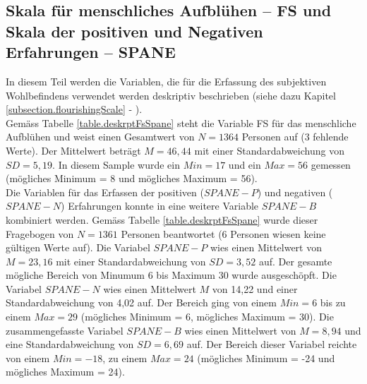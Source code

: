\subsection{Skala für menschliches Aufblühen -- FS und Skala der positiven und Negativen Erfahrungen -- SPANE}
In diesem Teil werden die Variablen, die für die Erfassung des subjektiven Wohlbefindens verwendet werden deskriptiv beschrieben (siehe dazu Kapitel \ref{subsection.flourishingScale} - ).\\
Gemäss Tabelle \ref{table.deskrptFsSpane} steht die Variable FS für das menschliche Aufblühen und weist einen Gesamtwert von $N = 1364$ Personen auf (3 fehlende Werte). Der Mittelwert beträgt $M = 46,44$ mit einer Standardabweichung von $SD = 5,19$. In diesem Sample wurde ein $Min = 17$ und ein $Max = 56$ gemessen (mögliches Minimum = 8 und mögliches Maximum = 56).\\
Die Variablen für das Erfassen der positiven ($SPANE-P$) und negativen ($SPANE-N$) Erfahrungen konnte in eine weitere Variable $SPANE-B$ kombiniert werden. Gemäss Tabelle \ref{table.deskrptFsSpane} wurde dieser Fragebogen von $N = 1361$ Personen beantwortet (6 Personen wiesen keine gültigen Werte auf). Die Variabel $SPANE-P$ wies einen Mittelwert von $M = 23,16$ mit einer Standardabweichung von $SD = 3,52$ auf. Der gesamte mögliche Bereich von Minumum 6 bis Maximum 30 wurde ausgeschöpft. Die Variabel $SPANE-N$ wies einen Mittelwert $M$ von 14,22 und einer Standardabweichung von 4,02 auf. Der Bereich ging von einem $Min = 6$ bis zu einem $Max = 29$ (mögliches Minimum = 6, mögliches Maximum = 30). Die zusammengefasste Variabel $SPANE-B$ wies einen Mittelwert von $M = 8,94$ und eine Standardabweichung von $SD = 6,69$ auf. Der Bereich dieser Variabel reichte von einem $Min = -18$, zu einem $Max = 24$ (mögliches Minimum = -24 und mögliches Maximum = 24).
